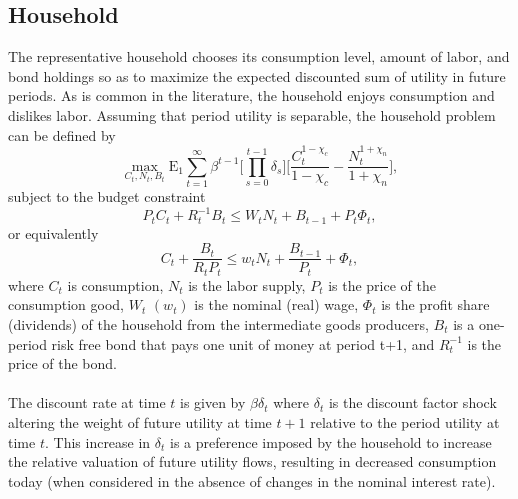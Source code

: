 \documentclass[11pt]{article}
\begin{document}
\begin{singlespace}
		\subsection{Household}
		
		\normalsize{The representative household chooses its consumption level, amount of labor, and bond holdings so as to maximize the expected discounted sum of utility in future periods. As is common in the literature, the household enjoys consumption and dislikes labor. Assuming that period utility is separable, the household problem can be defined by}
		\begin{equation}
			\max\limits_{C_{t},N_{t},B_{t}}\mathrm{E_{1}}\sum\limits_{t=1}^{\infty}\beta^{t-1}\Bigg[\prod\limits_{s=0}^{t-1}\delta_{s}\Bigg]\Bigg[\frac{C_{t}^{1-\chi_{c}}}{1-\chi_{c}}-\frac{N_{t}^{1+\chi_{n}}}{1+\chi_{n}}\Bigg],
		\end{equation}
		\normalsize{subject to the budget constraint}
		\begin{equation}
			P_{t}C_{t} + R_{t}^{-1}B_{t} \leq W_{t}N_{t}+B_{t-1}+P_{t}\Phi_{t}, %
		\end{equation}
		\normalsize{or equivalently}
		\begin{equation}
			C_{t} + \frac{B_{t}}{R_{t}P_{t}} \leq w_{t}N_{t} + \frac{B_{t-1}}{P_{t}}+\Phi_{t}, %
		\end{equation}
		\normalsize{where \(C_{t}\) is consumption, \(N_{t}\) is the labor supply, \(P_{t}\) is the price of the consumption good, \(W_{t}\) \((w_{t})\) is the nominal (real) wage, \(\Phi_{t}\) is the profit share (dividends) of the household from the intermediate goods producers, \(B_{t}\) is a one-period risk free bond that pays one unit of money at period t+1, and \(R_{t}^{-1}\) is the price of the bond.}\\\\
		
		\normalsize{The discount rate at time $t$ is given by \(\beta\delta_{t}\) where \(\delta_{t}\) is the discount factor shock altering the weight of future utility at time $t+1$ relative to the period utility at time $t$.} %
		\normalsize{This increase in \(\delta_{t}\) is a preference imposed by the household to increase the relative valuation of future utility flows, resulting in decreased consumption today (when considered in the absence of changes in the nominal interest rate).}
		

\end{singlespace}
\end{document}
